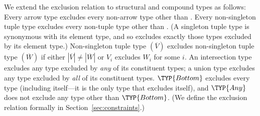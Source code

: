 \documentclass[10pt]{sigplanconf}
\renewcommand{\bar}{\overline}
\newcommand{\exc}{\mathrel{\lozenge}}
\newcommand{\excr}{\triangleright}
\newcommand{\excre}{\excr_\textrm{x}}
\newcommand{\excrc}{\excr_\textrm{c}}
\newcommand{\excro}{\excr_\textrm{o}}
\newcommand{\exce}{\exc_\textrm{x}}
\newcommand{\excc}{\exc_\textrm{c}}
\newcommand{\exco}{\exc_\textrm{o}}
\newcommand{\excp}{\exc_\textrm{m}}
\newcommand{\obb}[1]{\ensuremath{\llbracket \bar{#1} \rrbracket}}
\newcommand{\substb}[2]{\ensuremath{[\bar{#1}/\bar{#2}]}}
\newcommand{\Any}{\TYP{Any}}
\newcommand{\Bottom}{\TYP{Bottom}}
\begin{document}

  



We extend the exclusion relation 
to structural and compound types as follows:
Every arrow type excludes every non-arrow type other than \Any.
Every non-singleton tuple type excludes every non-tuple type other than \Any.
(A singleton tuple type is synonymous with its element type, 
and so excludes exactly those types excluded by its element type.)
Non-singleton tuple type $(\bar{V})$ excludes non-singleton tuple type
$(\bar{W})$ if either $|\bar{V}| \neq |\bar{W}|$
or $V_i$ excludes $W_i$ for some $i$.
An intersection type excludes any type excluded by \emph{any} of its constituent types;
a union type excludes any type excluded by \emph{all} of its constituent types.
$\Bottom$ excludes every type 
(including itself---it is the only type that excludes itself), 
and $\Any$ does not exclude any type other than $\Bottom$.
(We define the exclusion relation formally in Section~\ref{sec:constraints}.)
\end{document}
